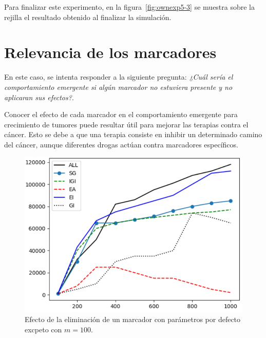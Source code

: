 Para finalizar este experimento, en la figura~\ref{fig:ownexp5-3} se muestra sobre la rejilla el resultado
obtenido al finalizar la simulación.

\clearpage

\section{Relevancia de los marcadores}

En este caso, se intenta responder a la siguiente pregunta: \textit{¿Cuál sería
el comportamiento emergente si algún marcador no estuviera presente y no aplicaran
sus efectos?}.

Conocer el efecto de cada marcador en el comportamiento emergente para crecimiento de tumores
puede resultar útil para mejorar las terapias contra el cáncer. Esto se debe a que una terapia
consiste en inhibir un determinado camino del cáncer, aunque diferentes drogas actúan contra marcadores específicos.

\begin{figure}[h]
\centering
\includegraphics[scale=0.8]{figures/experiments/exp7/exp7-1}
\caption{Efecto de la eliminación de un marcador con parámetros por defecto excpeto con $m = 100$.}
\label{fig:ownexp7-1}
\end{figure}

